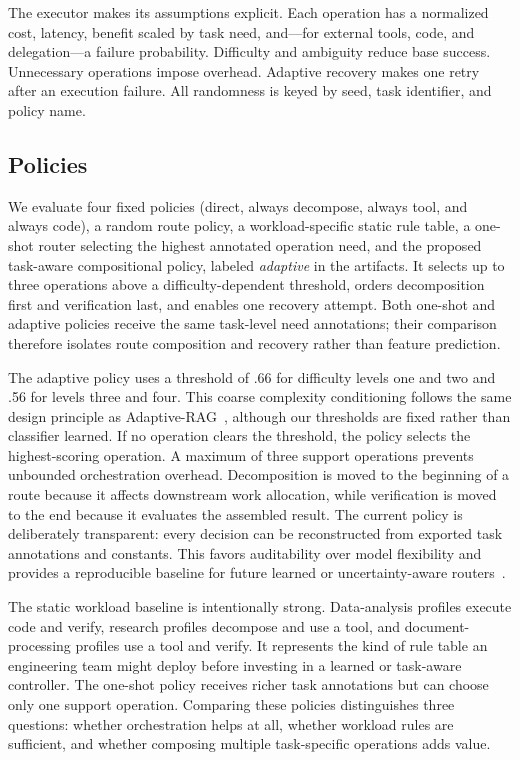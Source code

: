 \documentclass[sigconf]{acmart}
\begin{document}
The executor makes its assumptions explicit. Each operation has a normalized cost, latency, benefit scaled by task need, and---for external tools, code, and delegation---a failure probability. Difficulty and ambiguity reduce base success. Unnecessary operations impose overhead. Adaptive recovery makes one retry after an execution failure. All randomness is keyed by seed, task identifier, and policy name.

\subsection{Policies}

We evaluate four fixed policies (direct, always decompose, always tool, and always code), a random route policy, a workload-specific static rule table, a one-shot router selecting the highest annotated operation need, and the proposed task-aware compositional policy, labeled \emph{adaptive} in the artifacts. It selects up to three operations above a difficulty-dependent threshold, orders decomposition first and verification last, and enables one recovery attempt. Both one-shot and adaptive policies receive the same task-level need annotations; their comparison therefore isolates route composition and recovery rather than feature prediction.

The adaptive policy uses a threshold of .66 for difficulty levels one and two and .56 for levels three and four. This coarse complexity conditioning follows the same design principle as Adaptive-RAG~\cite{jeong2024adaptiverag}, although our thresholds are fixed rather than classifier learned. If no operation clears the threshold, the policy selects the highest-scoring operation. A maximum of three support operations prevents unbounded orchestration overhead. Decomposition is moved to the beginning of a route because it affects downstream work allocation, while verification is moved to the end because it evaluates the assembled result. The current policy is deliberately transparent: every decision can be reconstructed from exported task annotations and constants. This favors auditability over model flexibility and provides a reproducible baseline for future learned or uncertainty-aware routers~\cite{su2026cprouter,yan2026zerorouter}.

The static workload baseline is intentionally strong. Data-analysis profiles execute code and verify, research profiles decompose and use a tool, and document-processing profiles use a tool and verify. It represents the kind of rule table an engineering team might deploy before investing in a learned or task-aware controller. The one-shot policy receives richer task annotations but can choose only one support operation. Comparing these policies distinguishes three questions: whether orchestration helps at all, whether workload rules are sufficient, and whether composing multiple task-specific operations adds value.
\end{document}

